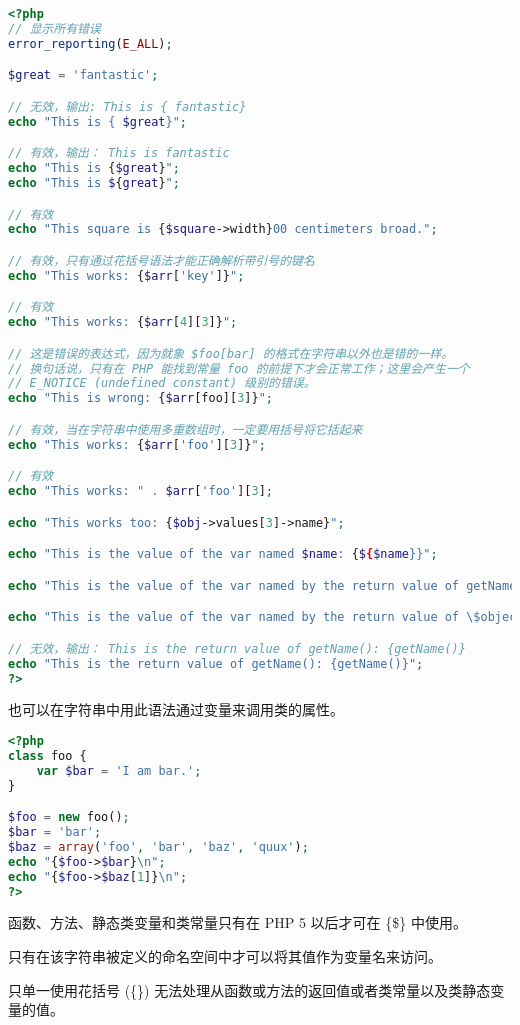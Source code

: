 \begin{compactitem}
\begin{lstlisting}[language=PHP]
<?php
// 显示所有错误
error_reporting(E_ALL);

$great = 'fantastic';

// 无效，输出: This is { fantastic}
echo "This is { $great}";

// 有效，输出： This is fantastic
echo "This is {$great}";
echo "This is ${great}";

// 有效
echo "This square is {$square->width}00 centimeters broad."; 

// 有效，只有通过花括号语法才能正确解析带引号的键名
echo "This works: {$arr['key']}";

// 有效
echo "This works: {$arr[4][3]}";

// 这是错误的表达式，因为就象 $foo[bar] 的格式在字符串以外也是错的一样。
// 换句话说，只有在 PHP 能找到常量 foo 的前提下才会正常工作；这里会产生一个
// E_NOTICE (undefined constant) 级别的错误。
echo "This is wrong: {$arr[foo][3]}"; 

// 有效，当在字符串中使用多重数组时，一定要用括号将它括起来
echo "This works: {$arr['foo'][3]}";

// 有效
echo "This works: " . $arr['foo'][3];

echo "This works too: {$obj->values[3]->name}";

echo "This is the value of the var named $name: {${$name}}";

echo "This is the value of the var named by the return value of getName(): {${getName()}}";

echo "This is the value of the var named by the return value of \$object->getName(): {${$object->getName()}}";

// 无效，输出： This is the return value of getName(): {getName()}
echo "This is the return value of getName(): {getName()}";
?>
\end{lstlisting}

也可以在字符串中用此语法通过变量来调用类的属性。

\begin{lstlisting}[language=PHP]
<?php
class foo {
    var $bar = 'I am bar.';
}

$foo = new foo();
$bar = 'bar';
$baz = array('foo', 'bar', 'baz', 'quux');
echo "{$foo->$bar}\n";
echo "{$foo->$baz[1]}\n";
?>
\end{lstlisting}

函数、方法、静态类变量和类常量只有在 PHP 5 以后才可在 \{\$\} 中使用。

\begin{compactitem}
\item 只有在该字符串被定义的命名空间中才可以将其值作为变量名来访问。
\item 只单一使用花括号 (\{\}) 无法处理从函数或方法的返回值或者类常量以及类静态变量的值。
\end{compactitem}



\end{compactitem}

